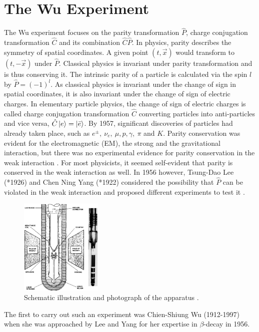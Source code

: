\chapter{The Wu Experiment}
\label{cha:wu_exp}

The Wu experiment focuses on the parity transformation $\hat P$, charge conjugation transformation $\hat C$ and its combination $\hat C\hat P$.
In physics, parity describes the symmetry of spatial coordinates.
A given point $(t, \vec x)$ would transform to $(t, -\vec x)$ under $\hat P$.
Classical physics is invariant under parity transformation and is thus conserving it.
The intrinsic parity of a particle is calculated via the spin $l$ by $ \hat P=(-1)^l$.
As classical physics is invariant under the change of sign in spatial coordinates, it is also invariant under the change of sign of electric charges.
In elementary particle physics, the change of sign of electric charges is called charge conjugation transformation $\hat C$ converting particles into anti-particles and vice versa, $\hat C \ket{e} = \ket{\bar e}$.
By 1957, significant discoveries of particles had already taken place, such as $e^\pm,\ \nu_e,\ \mu, p, \gamma,\ \pi$ and $K$.
Parity conservation was evident for the electromagnetic (EM), the strong and the gravitational interaction, but there was no experimental evidence for parity conservation in the weak interaction \cite{CaseStudies}.
For most physicists, it seemed self-evident that parity is conserved in the weak interaction as well.
In 1956 however, Tsung-Dao Lee (*1926) and Chen Ning Yang (*1922) considered the possibility that $\hat P$ can be violated in the weak interaction and proposed different experiments to test it  \cite{PhysRev.104.254}.
\begin{figure}
    \centering
    \includegraphics[width=0.35\textwidth]{figs/setup.png}
    \caption{Schematic illustration and photograph of the apparatus \cite{NIST}.}
    \label{fig:setup}
\end{figure}
The first to carry out such an experiment was Chien-Shiung Wu (1912-1997) when she was approached by Lee and Yang for her expertise in $\beta$-decay in 1956.
